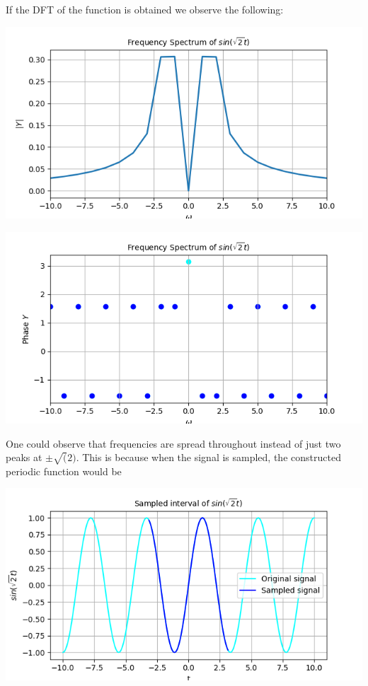\documentclass[12pt, a4paper]{report}
\begin{document}
If the DFT of the function is obtained we observe the following:
\begin{center}
	\includegraphics[scale=0.7]{Figure_1.png} 
	\label{fig:rawdata}
\end{center}
\begin{center}
	\includegraphics[scale=0.7]{Figure_2.png} 
	\label{fig:rawdata}
\end{center}
\clearpage
One could observe that frequencies are spread throughout instead of just two peaks at $ \pm \sqrt(2)$. This is because when the signal is sampled, the constructed periodic function would be
\begin{center}
	\includegraphics[scale=0.75]{Figure_3.png} 
	\label{fig:rawdata}
\end{center}
\end{document}
